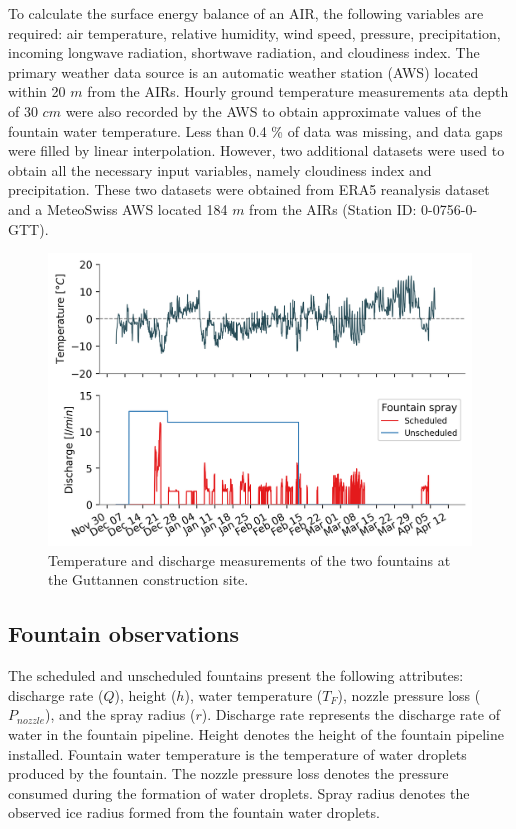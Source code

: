 \documentclass[tc, manuscript]{copernicus}
\begin{document}
To calculate the surface energy balance of an AIR, the following variables are required: air temperature,
relative humidity, wind speed, pressure, precipitation, incoming longwave radiation, shortwave radiation, and
cloudiness index. The primary weather data source is an automatic weather station (AWS) located within 20 $m$
from the AIRs. Hourly ground temperature measurements ata depth of 30 $cm$ were also recorded by the AWS to
obtain approximate values of the fountain water temperature. Less than 0.4 \% of data was missing, and data gaps
were filled by linear interpolation. However, two additional datasets were used to obtain all the necessary
input variables, namely cloudiness index and precipitation. These two datasets were obtained from ERA5
reanalysis dataset \citep{hersbachERA5GlobalReanalysis2020} and a MeteoSwiss AWS located 184 $m$ from the AIRs
(Station ID: 0-0756-0-GTT).

\begin{figure}[htb]
\includegraphics[width=12cm]{Figures/disvstemp.png}
\caption{Temperature and discharge measurements of the two fountains at the Guttannen construction site.}
\label{fig:aws} 
\end{figure}

\subsection{Fountain observations}

The scheduled and unscheduled fountains present the following attributes: discharge rate ($Q$), height ($h$), water
temperature ($T_F$), nozzle pressure loss ($P_{nozzle}$), and the spray radius ($r$). Discharge rate represents
the discharge rate of water in the fountain pipeline. Height denotes the height of the fountain pipeline
installed. Fountain water temperature is the temperature of water droplets produced by the fountain. The nozzle
pressure loss denotes the pressure consumed during the formation of water droplets. Spray radius denotes the
observed ice radius formed from the fountain water droplets.
\end{document}
